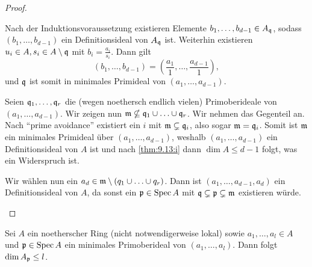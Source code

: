 \documentclass[12pt,a4paper]{scrartcl}
\theoremstyle{cplain}
\theoremstyle{cdef}
\begin{document}
\begin{proof}
\begin{enumerate}[label=\ref{thm:9.13:\roman*}]
\begin{description}
			Nach der Induktionsvoraussetzung existieren Elemente $b_1,\ldots,b_{d-1} \in A_{\mathfrak{q}}$, sodass $(b_1,\ldots,b_{d-1})$ ein Definitionsideal von $A_{\mathfrak{q}}$ ist. Weiterhin existieren $u_i \in A,s_i \in A \setminus \mathfrak{q}$ mit $b_i = \frac{a_i}{s_i}$. Dann gilt \[ (b_1,\ldots,b_{d-1}) = \left(\frac{a_1}1 ,\ldots , \frac{a_{d-1}}1 \right), \] und $\mathfrak{q}$ ist somit in minimales Primideal von $(a_1,\ldots,a_{d-1})$.
			
			Seien $\mathfrak{q}_1,\ldots,\mathfrak{q}_r$ die (wegen noethersch endlich vielen) Primoberideale von $(a_1,\ldots,a_{d-1})$. Wir zeigen nun $\mathfrak{m} \nsubseteq \mathfrak{q}_1 \cup \ldots\cup \mathfrak{q}_r$. Wir nehmen das Gegenteil an. Nach \enquote{prime avoidance} existiert ein $i$ mit $\mathfrak{m} \subsetneq \mathfrak{q}_i$, also sogar $\mathfrak{m} = \mathfrak{q}_i$. Somit ist $\mathfrak{m}$ ein minimales Primideal über $(a_1,\ldots,a_{d-1})$, weshalb $(a_1,\ldots,a_{d-1})$ ein Definitionsideal von $A$ ist und nach \ref{thm:9.13:i} dann $\dim A \le d-1$ folgt, was ein Widerspruch ist.

			Wir wählen nun ein $a_d \in \mathfrak{m} \setminus (q_1 \cup \ldots \cup q_r)$. Dann ist $(a_1,\ldots,a_{d-1},a_d)$ ein Definitionsideal von $A$, da sonst ein $\mathfrak{p} \in \operatorname{Spec} A$ mit $\mathfrak{q} \subsetneq \mathfrak{p} \subsetneq \mathfrak{m}$ existieren würde.
			\qedhere
		\end{description}
	\end{enumerate}
\end{proof}


\begin{kor}
	Sei $A$ ein noetherscher Ring (nicht notwendigerweise lokal) sowie $a_1,\dots, a_l\in A$ und $\mathfrak{p}\in\operatorname{Spec} A$ ein minimales Primoberideal von $(a_1,\dots, a_l)$. Dann folgt $\dim A_{\mathfrak{p}}\le l$. 
\end{kor}
\qedhere
\end{document}
